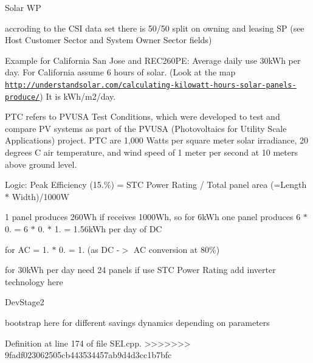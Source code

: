 \begin{DoxyRefDesc}{Solar W\+P}
\item[\hyperlink{wp__wp000003}{Solar W\+P}]accroding to the C\+S\+I data set there is 50/50 split on owning and leasing S\+P (see Host Customer Sector and System Owner Sector fields)\end{DoxyRefDesc}


Example for California San Jose and R\+E\+C260\+P\+E\+: Average daily use 30k\+Wh per day. For California assume 6 hours of solar. (Look at the map \href{http://understandsolar.com/calculating-kilowatt-hours-solar-panels-produce/}{\tt http\+://understandsolar.\+com/calculating-\/kilowatt-\/hours-\/solar-\/panels-\/produce/}) It is k\+Wh/m2/day.

P\+T\+C refers to P\+V\+U\+S\+A Test Conditions, which were developed to test and compare P\+V systems as part of the P\+V\+U\+S\+A (Photovoltaics for Utility Scale Applications) project. P\+T\+C are 1,000 Watts per square meter solar irradiance, 20 degrees C air temperature, and wind speed of 1 meter per second at 10 meters above ground level.

Logic\+: Peak Efficiency (15.\%) = S\+T\+C Power Rating / Total panel area (=Length $\ast$ Width)/1000\+W

1 panel produces 260\+Wh if receives 1000\+Wh, so for 6k\+Wh one panel produces 6 $\ast$ 0. = 6 $\ast$ 0. $\ast$ 1. = 1.\+56k\+Wh per day of D\+C

for A\+C = 1. $\ast$ 0. = 1. (as D\+C -\/$>$ A\+C conversion at 80\%)

for 30k\+Wh per day need 24 panels if use S\+T\+C Power Rating add inverter technology here

\begin{DoxyRefDesc}{Dev\+Stage2}
\item[\hyperlink{_dev_stage2__DevStage2000009}{Dev\+Stage2}]bootstrap here for different savings dynamics depending on parameters \end{DoxyRefDesc}


Definition at line 174 of file S\+E\+I.\+cpp.
>>>>>>> 9fadf023062505cb443534457ab9d4d3cc1b7bfc




